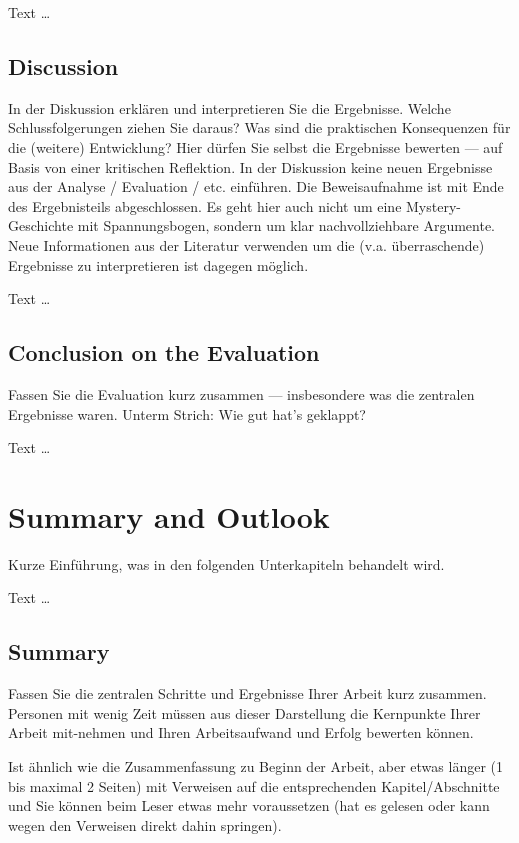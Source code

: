 \documentclass[11pt,a4paper,english]{scrreprt}
\newenvironment{comment}
  {\par\medskip
   \begingroup\color{olive}%
   }
 {\endgroup
  \medskip}
\begin{document}
Text \dots

\section{Discussion}
\begin{comment}
In der Diskussion erklären und interpretieren Sie die Ergebnisse. Welche Schlussfolgerungen ziehen Sie daraus? Was sind die praktischen Konsequenzen für die (weitere) Entwicklung? Hier dürfen Sie selbst die Ergebnisse bewerten — auf Basis von einer kritischen Reflektion.
In der Diskussion keine neuen Ergebnisse aus der Analyse / Evaluation / etc. einführen. Die Beweisaufnahme ist mit Ende des Ergebnisteils abgeschlossen. Es geht hier auch nicht um eine Mystery-Geschichte mit Spannungsbogen, sondern um klar nachvollziehbare Argumente. Neue Informationen aus der Literatur verwenden um die (v.a. überraschende) Ergebnisse zu interpretieren ist dagegen möglich.
\end{comment}

Text \dots

\section{Conclusion on the Evaluation}
\begin{comment}
Fassen Sie die Evaluation kurz zusammen — insbesondere was die zentralen Ergebnisse waren. Unterm Strich: Wie gut hat's geklappt?
\end{comment}

Text \dots

\newpage
\chapter{Summary and Outlook}
\begin{comment}
Kurze Einführung, was in den folgenden Unterkapiteln behandelt wird.
\end{comment}

Text \dots

\section{Summary}
\begin{comment}
Fassen Sie die zentralen Schritte und Ergebnisse Ihrer Arbeit kurz zusammen. Personen mit wenig Zeit müssen aus dieser Darstellung die Kernpunkte Ihrer Arbeit mit-nehmen und Ihren Arbeitsaufwand und Erfolg bewerten können.

Ist ähnlich wie die Zusammenfassung zu Beginn der Arbeit, aber etwas länger (1 bis maximal 2 Seiten) mit Verweisen auf die entsprechenden Kapitel/Abschnitte und Sie können beim Leser etwas mehr voraussetzen (hat es gelesen oder kann wegen den Verweisen direkt dahin springen).
\end{comment}
\end{document}
